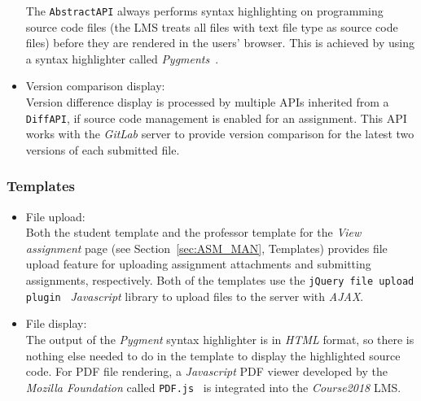 \begin{itemize}
    The \texttt{AbstractAPI} always performs
    syntax highlighting on programming source code files
    (the LMS treats all files with text file type as source code files)
    before they are rendered in the users' browser.
    This is achieved by
    using a syntax highlighter called \emph{Pygments}~\cite{pygments}.

    \item Version comparison display: \\
    Version difference display is processed by multiple APIs inherited from a
    \texttt{DiffAPI}, if source code management is enabled for an assignment.
    This API works with the \emph{GitLab} server to provide version comparison
    for the latest two versions of each submitted file.
\end{itemize}

\subsubsection{Templates}
\begin{itemize}
    \item File upload: \\
        Both the student template and the professor template for the
        \emph{View assignment} page (see Section~\ref{sec:ASM_MAN}, Templates)
        provides file upload feature for uploading
        assignment attachments and submitting assignments, respectively.
        Both of the templates use the
        \texttt{jQuery file upload plugin}~\citep[Section Description]{jqFileUpload}
        \emph{Javascript} library to upload files to the server with
        \emph{AJAX}.
    \item File display: \\
        The output of the \emph{Pygment} syntax highlighter is in \emph{HTML}
        format, so there is nothing else needed to do in the template to
        display the highlighted source code.
        For PDF file rendering, a \emph{Javascript} PDF viewer developed
        by the \emph{Mozilla Foundation} called \texttt{PDF.js}~\cite{pdfjs}
        is integrated into the \emph{Course2018} LMS.
\end{itemize}

\FloatBarrier





